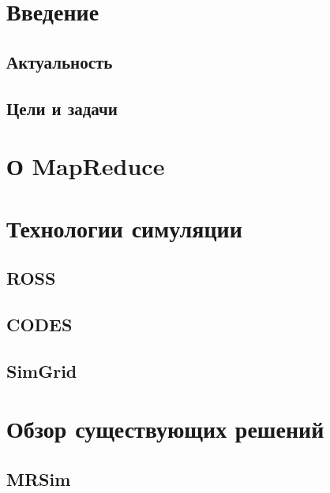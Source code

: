 \documentclass[a4paper,12pt]{article}
\begin{document}
    
    
    \pagestyle{plain}
    \tableofcontents
    
    \newpage

    \section{Введение}\label{sec:introduction}

    \subsection{Актуальность}\label{sec:relevance}

    \subsection{Цели и задачи}\label{sec:goals}

    \newpage

    \section{О MapReduce}\label{sec:whatismapred}

    \newpage
    
    \section{Технологии симуляции}

    \subsection{ROSS}

    \subsection{CODES}

    \subsection{SimGrid}

    \newpage

    \section{Обзор существующих решений}
    
    \subsection{MRSim}
\end{document}
